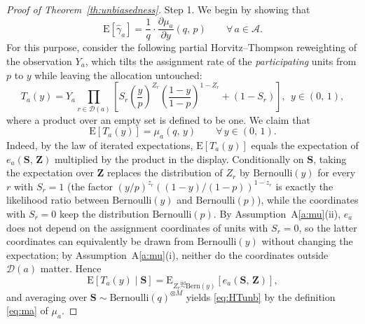 \documentclass[sigconf,nonacm]{acmart}
\newcommand{\E}{\mathrm E}
\newcommand{\iidsim}{{\stackrel{\mathrm{iid}}{\sim}}}
\begin{document}
\begin{proof}[Proof of Theorem~\ref{th:unbiasedness}]
Step 1. We begin by showing that
\begin{equation}\label{eq:EhatG=}
    \E[\hat \gamma_a] = \frac 1 q \cdot\frac{\partial\mu_a}{\partial y}(q,\,p)\qquad\forall\,a\in\mathcal A.
\end{equation}
For this purpose, consider the following partial Horvitz--Thompson reweighting of the observation $Y_a$, which tilts the assignment rate of the \emph{participating} units from $p$ to $y$ while leaving the allocation untouched:
\begin{equation*}
    T_a(y) = Y_a\prod_{r\in\mathcal{D}(a)}\left[S_r\left(\frac{y}{p}\right)^{Z_r}\left(\frac{1-y}{1-p}\right)^{1-Z_r} + (1-S_r)\right],\ \  y\in(0,\,1),
\end{equation*}
where a product over an empty set is defined to be one. We claim that
\begin{equation}\label{eq:HTunb}
    \E[T_a(y)] = \mu_a(q,\,y)\qquad \forall\,y\in(0,\,1).
\end{equation}
Indeed, by the law of iterated expectations, $\E[T_a(y)]$ equals the expectation of $e_a(\mathbf S,\,\mathbf Z)$ multiplied by the product in the display. Conditionally on $\mathbf S$, taking the expectation over $\mathbf Z$ replaces the distribution of $Z_r$ by $\mathrm{Bernoulli}(y)$ for every $r$ with $S_r=1$ (the factor $(y/p)^{z_r}((1-y)/(1-p))^{1-z_r}$ is exactly the likelihood ratio between $\mathrm{Bernoulli}(y)$ and $\mathrm{Bernoulli}(p)$), while the coordinates with $S_r=0$ keep the distribution $\mathrm{Bernoulli}(p)$. By Assumption~A\ref{a:mu}(ii), $e_a$ does not depend on the assignment coordinates of units with $S_r=0$, so the latter coordinates can equivalently be drawn from $\mathrm{Bernoulli}(y)$ without changing the expectation; by Assumption~A\ref{a:mu}(i), neither do the coordinates outside $\mathcal D(a)$ matter. Hence
\begin{equation*}
    \E[T_a(y)\mid \mathbf S] = \E_{Z_r\iidsim \mathrm{Bern}(y)}\left[e_a(\mathbf S,\,\mathbf Z)\right],
\end{equation*}
and averaging over $\mathbf S\sim \mathrm{Bernoulli}(q)^{\otimes M}$ yields \eqref{eq:HTunb} by the definition \eqref{eq:ma} of $\mu_a$.


\end{proof}
\end{document}
